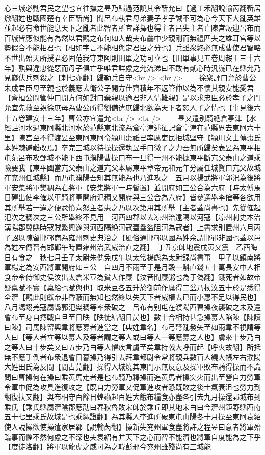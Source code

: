 心三城必動君民之望也宜往撫之昱乃歸過范說其令靳允曰【過工禾翻說輸芮翻靳居焮翻姓也戰國楚冇幸臣靳尚】聞呂布執君母弟妻子孝子誠不可為心今天下大亂英雄並起必有命世能息天下之亂者此智者所宜詳擇也得主者昌失主者亡陳宫叛迎呂布而百城皆應似能有為然以君觀之布何如人哉夫布麤中少親剛而無禮匹夫之雄耳宫等以勢假合不能相君也【相如字言不能相與定君臣之分也】兵雖衆終必無成曹使君智略不世出殆天所授君必固范我守東阿則田單之功可立也【田單事見五卷周赧王三十六年】孰與違忠從惡而母子俱亡乎唯君詳慮之允流涕曰不敢有貳心時汎嶷已在縣允乃見嶷伏兵刺殺之【刺七亦翻】歸勒兵自守<br />
<br />
　　徐衆評曰允於曹公未成君臣母至親也於義應去衛公子開方仕齊積年不返管仲以為不懷其親安能愛君【齊桓公問管仲曰開方何如對曰棄親以適君非人情難親】是以求忠臣必於孝子之門允宜先救至親徐庶母為曹公所得劉備遣庶歸北欲為天下者恕人子之情也【事見後六十五卷建安十三年】曹公亦宜遣允<br />
<br />
　　昱又遣别騎絶倉亭津【水經註河水過東阿縣北河水於范縣東北流為倉亭津述征記倉亭津在范縣界去東阿六十里】陳宫至不得渡昱至東阿東阿令潁川棗祇已率厲吏民拒城堅守【潁川文士傳棗氏本姓棘避難改焉】卒完三城以待操操還執昱手曰微子之力吾無所歸矣表昱為東平相屯范呂布攻鄄城不能下西屯濮陽曹操曰布一旦得一州不能據東平斷亢父泰山之道乘險要我【東平國當亢父泰山之道亢父本屬東平章帝元和元年分屬任城賢曰亢父故城在兖州任城縣】而乃屯濮陽吾知其無能為也乃進攻之　五月以揚武將軍郭汜為後將軍安集將軍樊稠為右將軍【安集將軍一時暫置】並開府如三公合為六府【時太傅馬日磾出使李傕以車騎將軍開府汜稠又開府與三公合為六府】皆參選舉李傕等各欲用其所舉若一違之便忿憤喜怒主者患之乃以次第用其所舉【主者蓋尚書也】先從傕起汜次之稠次之三公所舉終不見用　河西四郡以去凉州治遠隔以河寇【凉州刺史本治漢陽郡冀縣時寇賊繁興遂與河西隔絶河寇蓋羣盜阻河為寇者】上書求别置州六月丙子詔以陳留邯鄲商為雍州刺史典治之【風俗通邯鄲以國為姓余謂邯鄲非國也蓋以邑為姓左傳晉有邯鄲午時置雍州治武威治直之翻】　丁丑京師地震戊寅又震　乙酉晦日有食之　秋七月壬子太尉朱儁免戊午以太常楊彪為太尉録尚書事　甲子以鎮南將軍楊定為安西將軍開府如三公　自四月不雨至于是月糓一斛直錢五十萬長安中人相食帝令侍御史侯汶出太倉米豆為貧人作糜【汶音聞糜粥也為于偽翻】餓死者如故帝疑禀賦不實【稟給也賦與也】取米豆各五升於御前作糜得二盆乃杖汶五十於是悉得全濟【觀此則獻帝非昏蔽而無知也然終以失天下者威權去已而小惠不足以得民也】　八月馮翊羌寇屬縣郭汜樊稠等率衆破之　呂布有别屯在濮陽西曹操夜襲破之未及還會布至身自摶戰自旦至日昳【昳徒結翻日昃也】數十合相持甚急操募人陷陳【陳讀曰陳】司馬陳留興韋將應募者進當之【典姓韋名】布弓弩亂發矢至如雨韋不視謂等人曰【等人者立等以募人及等者謂之等人或曰等人一等應募之人也】虜來十步乃白之等人曰十步矣又曰五步乃白等人懼疾言虜至矣韋持戟大呼而起【呼火故翻】所抵無不應手倒者布衆退會日暮操乃得引去拜韋都尉令常將親兵數百人繞大帳左右濮陽大姓田氏為反間【間古莧翻】操得入城燒其東門示無反意及操軍敗布騎得操而不識問曰曹操何在操曰乘黄馬走者是也布騎乃釋操而追黄馬者操突火而出至營自力勞軍令軍中促為攻具進復攻之【既自力勞軍又促軍進攻者恐既敗之後士氣衰沮也勞力到翻復扶又翻】與布相守百餘日蝗蟲起百姓大餓布糧食亦盡各引去九月操還鄄城布到乘氏【乘氏縣屬濟陰郡應劭曰春秋魯敗宋師於乘丘即其地宋白曰今濟州鉅野縣西南五十七里乘氏故城是也乘繩證翻】為其縣人李進所破東屯山陽冬十月操至東阿袁紹使人說操欲使操遣家居鄴【說輸芮翻】操新失兖州軍食盡將許之程昱曰意者將軍殆臨事而懼不然何慮之不深也夫袁紹有并天下之心而智不能濟也將軍自度能為之下乎【度徒洛翻】將軍以龍虎之威可為之韓彭邪今兖州雖殘尚有三城能